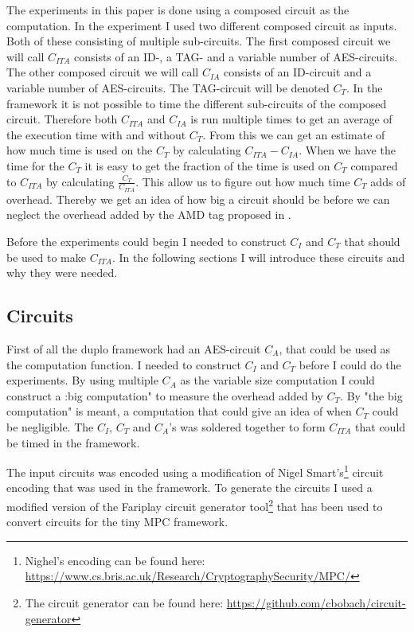 \documentclass[10pt,a4paper]{article}
\newcommand{\todo}[1]{}
\renewcommand{\todo}[1]{{\color{red} TODO: {#1}} \\}
\begin{document}
The experiments in this paper is done using a composed circuit as the computation. In the experiment I used two different composed circuit as inputs. Both of these consisting of multiple sub-circuits. The first composed circuit we will call $C_{ITA}$ consists of an ID-, a TAG- and a variable number of AES-circuits. The other composed circuit we will call $C_{IA}$ consists of an ID-circuit and a variable number of AES-circuits. The TAG-circuit will be denoted $C_{T}$. In the framework it is not possible to time the different sub-circuits of the composed circuit. Therefore both $C_{ITA}$ and $C_{IA}$ is run multiple times to get an average of the execution time with and without $C_{T}$. From this we can get an estimate of how much time is used on the $C_{T}$ by calculating $C_{ITA}-C_{IA}$. When we have the time for the $C_{T}$ it is easy to get the fraction of the time is used on $C_{T}$ compared to $C_{ITA}$ by calculating $\frac{C_{T}}{C_{ITA}}$. This allow us to figure out how much time $C_{T}$ adds of overhead. Thereby we get an idea of how big a circuit should be before we can neglect the overhead added by the AMD tag proposed in \cite{fosc}.

Before the experiments could begin I needed to construct $C_I$ and $C_T$ that should be used to make $C_{ITA}$. In the following sections I will introduce these circuits and why they were needed.

\subsection{Circuits}
First of all the duplo framework had an AES-circuit $C_A$, that could be used as the computation function. I needed to construct $C_I$ and $C_T$ before I could do the experiments. By using multiple $C_A$ as the variable size computation I could construct a :big computation" to measure the overhead added by $C_T$. By "the big computation" is meant, a computation that could give an idea of when $C_{T}$ could be negligible. The $C_I$, $C_T$ and $C_A$'s was soldered together to form $C_{ITA}$ that could be timed in the framework.

\bigskip
The input circuits was encoded using a modification of Nigel Smart's\footnote{Nighel's encoding can be found here: \url{https://www.cs.bris.ac.uk/Research/CryptographySecurity/MPC/}} circuit encoding that was used in the framework. To generate the circuits I used a modified version of the Fariplay circuit generator tool\footnote{The circuit generator can be found here: \url{https://github.com/cbobach/circuit-generator}} that has been used to convert circuits for the tiny MPC framework.
\end{document}
